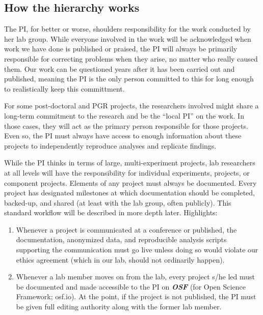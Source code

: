 \documentclass[
  12pt,
]{book}
\begin{document}
\subsection{How the hierarchy works}\label{how-the-hierarchy-works}

The PI, for better or worse, shoulders responsibility for the work conducted by her lab group. While everyone involved in the work will be acknowledged when work we have done is published or praised, the PI will always be primarily responsible for correcting problems when they arise, no matter who really caused them. Our work can be questioned years after it has been carried out and published, meaning the PI is the only person committed to this for long enough to realistically keep this committment.

For some post-doctoral and PGR projects, the researchers involved might share a long-term commitment to the research and be the ``local PI'' on the work. In those cases, they will act as the primary person responsible for those projects. Even so, the PI must always have access to enough information about these projects to independently reproduce analyses and replicate findings.

While the PI thinks in terms of large, multi-experiment projects, lab researchers at all levels will have the responsibility for individual experiments, projects, or component projects. Elements of any project must always be documented. Every project has designated milestones at which documentation should be completed, backed-up, and shared (at least with the lab group, often publicly). This standard workflow will be described in more depth later. Highlights:

\begin{enumerate}
\def\labelenumi{\arabic{enumi}.}
\item
  Whenever a project is communicated at a conference or published, the documentation, anonymized data, and reproducible analysis scripts supporting the communication must go live unless doing so would violate our ethics agreement (which in our lab, should not ordinarily happen).
\item
  Whenever a lab member moves on from the lab, every project s/he led must be documented and made accessible to the PI on \textbf{\emph{OSF}} (for Open Science Framework; osf.io). At the point, if the project is not published, the PI must be given full editing authority along with the former lab member.
\end{enumerate}
\end{document}
